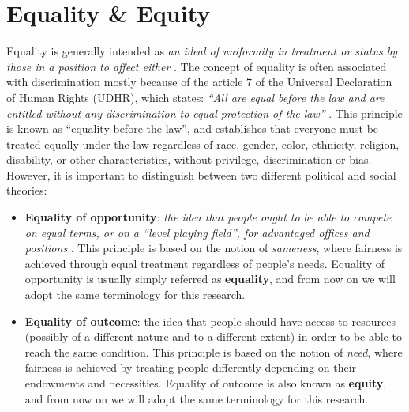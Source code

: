 \section{Equality \& Equity}
Equality is generally intended as \emph{an ideal of uniformity in treatment or status by those in a position to affect either} \cite{britannica2009equality}. The concept of equality is often associated with discrimination mostly because of the article 7 of the Universal Declaration of Human Rights (UDHR), which states: \emph{``All are equal before the law and are entitled without any discrimination to equal protection of the law''} \cite[p.2]{assembly1948universal}. This principle is known as ``equality before the law'', and establishes that everyone must be treated equally under the law regardless of race, gender, color, ethnicity, religion, disability, or other characteristics, without privilege, discrimination or bias.
However, it is important to distinguish between two different political and social theories:
\begin{itemize}
\item \textbf{Equality of opportunity}: \emph{the idea that people ought to be able to compete on equal terms, or on a ``level playing field'', for advantaged offices and positions} \cite{britannica2019equal}. This principle is based on the notion of \textit{sameness}, where fairness is achieved through equal treatment regardless of people's needs. Equality of opportunity is usually simply referred as \textbf{equality}, and from now on we will adopt the same terminology for this research.
\item \textbf{Equality of outcome}: the idea that people should have access to resources (possibly of a different nature and to a different extent) in order to be able to reach the same condition. This principle is based on the notion of \textit{need}, where fairness is achieved by treating people differently depending on their endowments and necessities. Equality of outcome is also known as \textbf{equity}, and from now on we will adopt the same terminology for this research.
\end{itemize}

